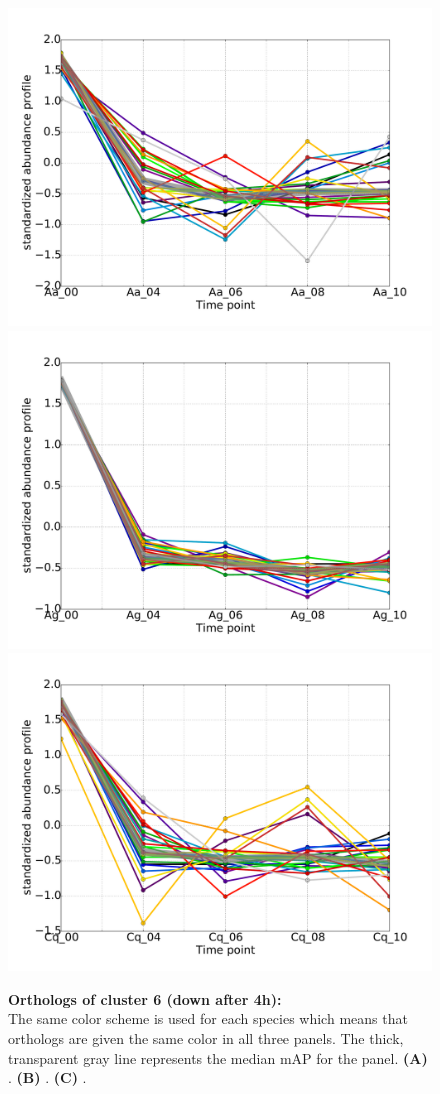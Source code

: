 
\begin{figure}[p]
% 
\subcaptionbox{\label{fig:cluster6-Aa}}
{\includegraphics[width=.5\linewidth]{figures/figs/ecr_and_insects_ptci_20130918_orthodb7/downAfter4_gene_profiles_from_cummerbund/Aa_downAfter4_cls6_Ag_target_FPKMs_vb_orthos.pdf}}
%
\subcaptionbox{\label{fig:cluster6-Ag}}
{\includegraphics[width=.5\linewidth]{figures/figs/ecr_and_insects_ptci_20130918_orthodb7/downAfter4_gene_profiles_from_cummerbund/Ag_downAfter4_cls6_Ag_target_FPKMs_vb_orthos.pdf}}
%
\subcaptionbox{\label{fig:cluster6-Cq}}
{\includegraphics[width=.5\linewidth]{figures/figs/ecr_and_insects_ptci_20130918_orthodb7/downAfter4_gene_profiles_from_cummerbund/Cq_downAfter4_cls6_Ag_target_FPKMs_vb_orthos.pdf}}
% 
\caption[Orthologs of cluster 6]{\sf \textbf{Orthologs of cluster 6 (down after 4h):}\\
The same color scheme is used for each species which means that orthologs are given the same color in all three panels.
The thick, transparent gray line represents the median \gls{mAP} for the panel.
\textbf{(A)} \Aa.
\textbf{(B)} \Ag.
\textbf{(C)} \Cq.
}\label{fig:cluster6}
\end{figure}